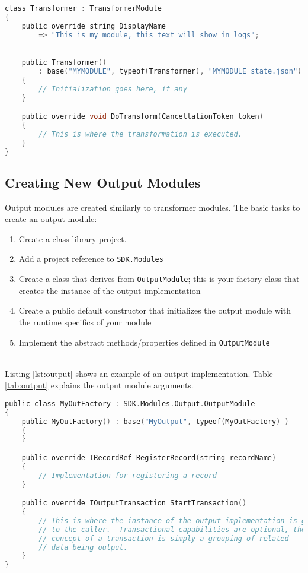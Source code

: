 \begin{lstlisting}[caption={Example Transformer Module}, label={lst:xform}, language=C]
class Transformer : TransformerModule
{
    public override string DisplayName 
        => "This is my module, this text will show in logs";

    
    public Transformer() 
        : base("MYMODULE", typeof(Transformer), "MYMODULE_state.json")
    {
        // Initialization goes here, if any
    }

    public override void DoTransform(CancellationToken token)
    {
        // This is where the transformation is executed.
    }
}
\end{lstlisting}

\subsection{Creating New Output Modules}

Output modules are created similarly to transformer modules.  The basic tasks to create an output module:

\begin{enumerate}
    \item Create a class library project.
    \item Add a project reference to \texttt{SDK.Modules}
    \item Create a class that derives from \texttt{OutputModule}; this is your factory class that creates the instance of the output implementation
    \item Create a public default constructor that initializes the output module with the runtime specifics of your module
    \item Implement the abstract methods/properties defined in \texttt{OutputModule}
\end{enumerate}

\noindent\\Listing \ref{lst:output} shows an example of an output implementation.  Table \ref{tab:output} explains the output
module arguments.


\begin{lstlisting}[caption={Example Output Module}, label={lst:output}, language=C]
public class MyOutFactory : SDK.Modules.Output.OutputModule
{
    public MyOutFactory() : base("MyOutput", typeof(MyOutFactory) )
    {
    }

    public override IRecordRef RegisterRecord(string recordName)
    {
        // Implementation for registering a record
    }

    public override IOutputTransaction StartTransaction()
    {
        // This is where the instance of the output implementation is given
        // to the caller.  Transactional capabilities are optional, the
        // concept of a transaction is simply a grouping of related
        // data being output.
    }
}    
\end{lstlisting}


